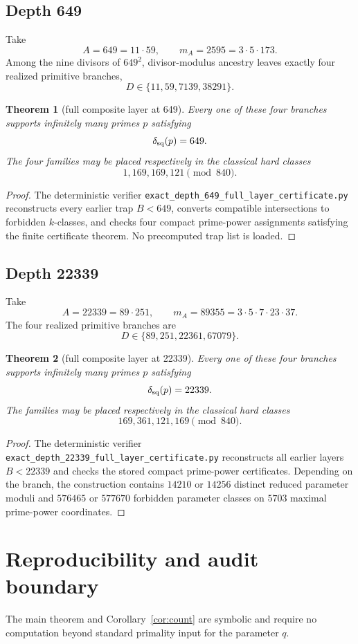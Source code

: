 \documentclass[11pt]{article}
\newtheorem{theorem}{Theorem}
\theoremstyle{definition}
\begin{document}
\subsection{Depth 649}
Take
\[
A=649=11\cdot59,
\qquad
m_A=2595=3\cdot5\cdot173.
\]
Among the nine divisors of $649^2$, divisor-modulus ancestry leaves exactly four realized primitive branches,
\[
D\in\{11,59,7139,38291\}.
\]

\begin{theorem}[full composite layer at 649]
Every one of these four branches supports infinitely many primes $p$ satisfying
\[
\delta_{\rm sq}(p)=649.
\]
The four families may be placed respectively in the classical hard classes
\[
1,169,169,121\pmod{840}.
\]
\end{theorem}

\begin{proof}
The deterministic verifier \texttt{exact\_depth\_649\_full\_layer\_certificate.py} reconstructs every earlier trap $B<649$, converts compatible intersections to forbidden $k$-classes, and checks four compact prime-power assignments satisfying the finite certificate theorem.  No precomputed trap list is loaded.
\end{proof}

\subsection{Depth 22339}
Take
\[
A=22339=89\cdot251,
\qquad
m_A=89355=3\cdot5\cdot7\cdot23\cdot37.
\]
The four realized primitive branches are
\[
D\in\{89,251,22361,67079\}.
\]

\begin{theorem}[full composite layer at 22339]
Every one of these four branches supports infinitely many primes $p$ satisfying
\[
\delta_{\rm sq}(p)=22339.
\]
The families may be placed respectively in the classical hard classes
\[
169,361,121,169\pmod{840}.
\]
\end{theorem}

\begin{proof}
The deterministic verifier \texttt{exact\_depth\_22339\_full\_layer\_certificate.py} reconstructs all earlier layers $B<22339$ and checks the stored compact prime-power certificates.  Depending on the branch, the construction contains $14210$ or $14256$ distinct reduced parameter moduli and $576465$ or $577670$ forbidden parameter classes on $5703$ maximal prime-power coordinates.
\end{proof}

\section{Reproducibility and audit boundary}
The main theorem and Corollary~\ref{cor:count} are symbolic and require no computation beyond standard primality input for the parameter $q$.
\end{document}
